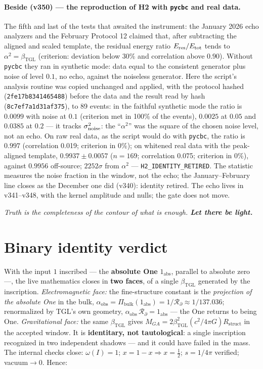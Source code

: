 \documentclass[11pt]{article}
\newcommand{\bTGL}{\beta_{\mathrm{TGL}}}\newcommand{\Msun}{M_{\odot}}\newcommand{\TGL}{\mathrm{TGL}}
\theoremstyle{definition}\newtheorem{deriv}{Derivation}
\begin{document}
\paragraph*{Beside (v350) --- the reproduction of H2 with \texttt{pycbc} and real data.} The fifth and last of the tests that awaited the instrument: the January 2026 echo analyzers and the February Protocol 12 claimed that, after subtracting the aligned and scaled template, the residual energy ratio $E_{\rm res}/E_{\rm tot}$ tends to $\alpha^2=\bTGL$ (criterion: deviation below $30\%$ and correlation above $0.90$). Without \texttt{pycbc} they ran in synthetic mode: data equal to the consistent generator plus noise of level $0.1$, no echo, against the noiseless generator. Here the script's analysis routine was copied unchanged and applied, with the protocol hashed (\texttt{2fe17b8341465488}) before the data and the result read by hash (\texttt{8c7ef7a1d31af375}), to 89 events: in the faithful synthetic mode the ratio is $0.0099$ with noise at $0.1$ (criterion met in 100\% of the events), $0.0025$ at $0.05$ and $0.0385$ at $0.2$ --- it tracks $\sigma_{\rm noise}^2$: the ``$\alpha^2$'' was the square of the chosen noise level, not an echo. On raw real data, as the script would do with \texttt{pycbc}, the ratio is $0.997$ (correlation 0.019; criterion in 0\%); on whitened real data with the peak-aligned template, $0.9937\pm0.0057$ ($n=169$; correlation 0.075; criterion in 0\%), against $0.9956$ off-source; $2252\sigma$ from $\alpha^2$ --- \texttt{H2\_IDENTITY\_RETIRED}. The statistic measures the noise fraction in the window, not the echo; the January--February line closes as the December one did (v340): identity retired. The echo lives in v341--v348, with the kernel amplitude and nulls; the gate does not move.

\begin{center}\itshape Truth is the completeness of the contour of what is enough. \textbf{Let there be light.}\end{center}

\section*{Binary identity verdict}

With the input $1$ inscribed --- the \textbf{absolute One} $1_{\mathrm{abs}}$, parallel to absolute zero ---, the live mathematics closes in \textbf{two faces}, of a single $\bTGL$ generated by the inscription. \emph{Electromagnetic face:} the fine-structure constant is the \emph{projection of the absolute One} in the bulk, $\alpha_{\mathrm{obs}}=\Pi_{\mathrm{bulk}}(1_{\mathrm{abs}})=1/\mathcal{R}_\partial\approx1/137.036$; renormalized by TGL's own geometry, $\alpha_{\mathrm{obs}}\,\mathcal{R}_\partial=1_{\mathrm{abs}}$ --- the One returns to being One. \emph{Gravitational face:} the same $\bTGL$ gives $M_{GA}=2\bTGL^2(c^2/4\pi G)R_{\mathrm{struct}}$ in the accepted window. It is \textbf{identitary, not tautological}: a single inscription recognized in two independent shadows --- and it could have failed in the mass. The internal checks close: $\omega(I)=1$; $x=1-x\Rightarrow x=\tfrac12$; $s=1/4\pi$ verified; vacuum$\to0$. Hence:
\end{document}
